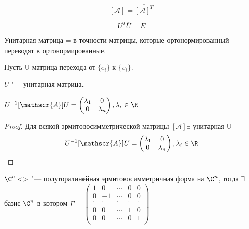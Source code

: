 $$[\mathscr{A}] = \overline{[\mathscr{A}]^T}$$

$$U^{T}\overline{U} = E$$

Унитарная матрица  = в точности матрицы, которые ортонормированный переводят в ортонормированные. 

Пусть U матрица перехода от $\{e_i\}$ к $\{v_i\}$.

$U$  "--- унитарная матрица. 

$U^{-1}[\mathscr{A}]U = \begin{pmatrix}
\lambda_1&0\\
0&\lambda_n\\
\end{pmatrix}, \lambda_i \in \R$ 

\begin{proof}
Для всякой эрмитовосимметрической матрицы  $[\mathscr{A}] \exists$ унитарная U
$$U^{-1}[\mathscr{A}]U = \begin{pmatrix}
\lambda_1&0\\
0&\lambda_n\\
\end{pmatrix}, \lambda_i \in \R$$
\end{proof}

\begin{theorem}{}
$\C^n < >$ "--- полуторалинейная эрмитовосимметричная форма на $\C^n$,
тогда $\exists$  базис $\C^n$ в котором 
$\Gamma = \begin{pmatrix}
1&0&\cdots&0&0\\
0&-1&\cdots&0&0\\
\cdot &\cdot & \cdot& \cdot& \cdot\\
0&0&\cdots &1&0\\
0&0&\cdots &0&1\\
\end{pmatrix}$
\end{theorem}

